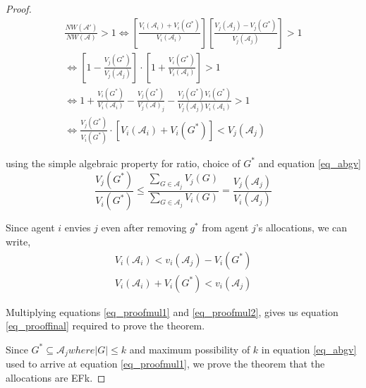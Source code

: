 \begin{proof}
\begin{equation}
\label{eq_prooffinal}
\begin{gathered}
    \frac{NW(\mathcal{A}')}{NW(\mathcal{A})} > 1 \Leftrightarrow \left[ \frac{V_i(\mathcal{A}_i) + V_i(G^*)}{V_i(\mathcal{A}_i)} \right] \left[ \frac{V_j(\mathcal{A}_j) - V_j(G^*)}{V_j(\mathcal{A}_j)} \right] > 1 \\
    \Leftrightarrow \left[1 - \frac{V_j(G^*)}{V_j(\mathcal{A}_j)}\right] \cdot \left[1 + \frac{V_i(G^*)}{V_i(\mathcal{A}_i)}\right] > 1 \\
    \Leftrightarrow 1 + \frac{V_i(G^*)}{V_i(\mathcal{A}_i)} - \frac{V_j(G^*)}{V_j(\mathcal{A})_j} - \frac{V_j(G^*) V_i(G^*)}{V_j(\mathcal{A}_j) V_i(\mathcal{A}_i)} > 1 \\
    \Leftrightarrow \frac{V_j(G^*)}{V_i(G^*)} \cdot \left[V_i(\mathcal{A}_i) + V_i(G^*) \right] < V_j(\mathcal{A}_j)
\end{gathered}
\end{equation}

using the simple algebraic property for ratio, choice of $G^*$ and equation \ref{eq_abgv}
\begin{equation}
\label{eq_proofmul1}
    \frac{V_j(G^*)}{V_i(G^*)} \leq \frac{\sum_{G \in \mathcal{A}_j}V_j(G)}{\sum_{G \in \mathcal{A}_j}V_i(G)} = \frac{V_j(\mathcal{A}_j)}{V_i(\mathcal{A}_j)}
\end{equation}

Since agent $i$ envies $j$ even after removing $g^*$ from agent $j$'s allocations, we can write,
\begin{equation}
\label{eq_proofmul2}
\begin{gathered}
    V_i(\mathcal{A}_i) < v_i(\mathcal{A}_j) - V_i(G^*) \\
    V_i(\mathcal{A}_i) + V_i(G^*) < v_i(\mathcal{A}_j)
\end{gathered}
\end{equation}

Multiplying equations \ref{eq_proofmul1} and \ref{eq_proofmul2}, gives us equation \ref{eq_prooffinal} required to prove the theorem.

Since $G^* \subseteq \mathcal{A}_j where |G| \leq k$ and maximum possibility of $k$ in equation \ref{eq_abgv} used to arrive at equation \ref{eq_proofmul1}, we prove the theorem that the allocations are EFk.

\end{proof}


